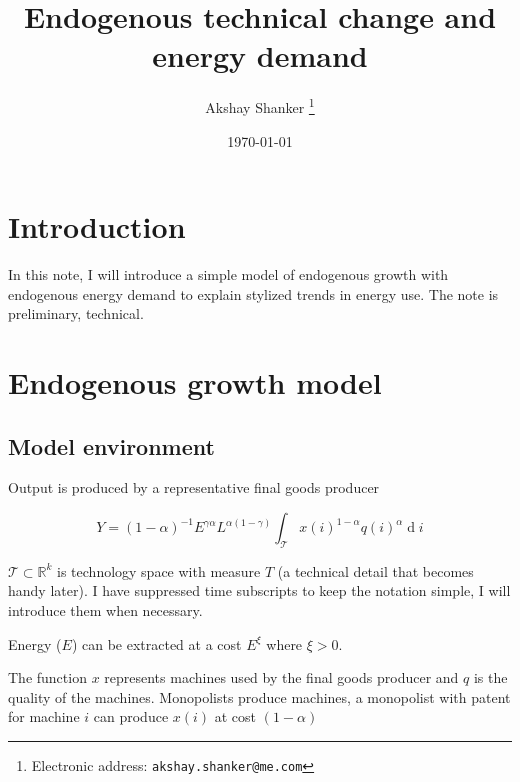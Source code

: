\documentclass[12pt,english]{article}
\DeclareMathOperator{\di}{d}
\theoremstyle{definition}
\theoremstyle{plain}
\theoremstyle{plain}
\theoremstyle{remark}
\theoremstyle{definition}
\theoremstyle{plain}
\theoremstyle{plain}
\theoremstyle{remark}
\theoremstyle{plain}
\theoremstyle{remark}
\theoremstyle{plain}
\theoremstyle{plain}
\theoremstyle{plain}
\begin{document}
	
	
	\title{Endogenous technical change and energy demand}
	
	
	\author{Akshay Shanker%
		\thanks{Electronic address: \texttt{akshay.shanker@me.com}}}
	

	
	
	\date{\today}
	
	\maketitle
	
	
	\maketitle
	
\section{Introduction}

In this note, I will introduce a simple model of endogenous growth with endogenous energy demand to explain stylized trends in energy use. The note is preliminary, technical. 

\section{Endogenous growth model}
\subsection{Model environment}

Output is produced by a representative final goods producer 

\begin{equation*}
Y = \left(1-\alpha\right)^{-1}E^{\gamma\alpha}L^{\alpha\left(1-\gamma\right)} \int_{\mathscr{T}}x\left(i\right)^{1-\alpha}q\left(i\right)^{\alpha}\di i
\end{equation*}

$\mathscr{T}\subset \mathbb{R}^{k}$ is technology space with measure $T$ (a technical detail that becomes handy later). I have suppressed time subscripts to keep the notation simple, I will introduce them when necessary. 
	
Energy ($E$) can be extracted at a cost $E^{\xi}$ where $\xi>0$. 


The function $x$ represents machines used by the final goods producer and $q$ is the quality of the machines. Monopolists produce machines, a monopolist with patent for machine $i$ can produce $x\left(i\right)$ at cost $\left(1-\alpha\right)$
\end{document}
